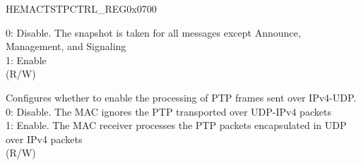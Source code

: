 \begin{register}{H}{EMACTSTPCTRL\_REG}{0x0700}
\begin{regdesc}
\begin{reglist}
0: Disable. The snapshot is taken for all messages except Announce, Management, and Signaling\\
1: Enable\\ (R/W)
\item [TSIPV4ENA] Configures whether to enable the processing of PTP frames sent over IPv4-UDP.\\
0: Disable. The MAC ignores the PTP transported over UDP-IPv4 packets\\
1: Enable. The MAC receiver processes the PTP packets encapsulated in UDP over IPv4 packets\\ (R/W)

\item [Continued on the next page...]
\end{reglist}\end{regdesc}
\end{register}

